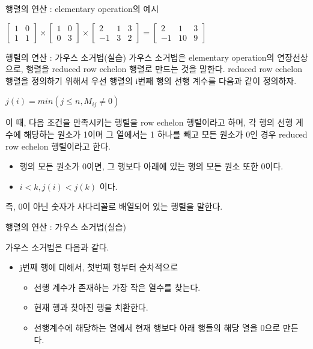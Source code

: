 \documentclass{beamer}
\begin{document}
\begin{frame}{행렬의 연산 : elementary operation의 예시}
\begin{itemize}
$ 
\left[ \begin{matrix}
1 & 0  \\
1 & 1 
\end{matrix} \right] \times 
\left[ \begin{matrix}
1 & 0  \\
0 & 3 
\end{matrix} \right] \times
\left[ \begin{matrix}
2 & 1 & 3   \\
-1 & 3 & 2 
\end{matrix} \right] = 
\left[ \begin{matrix}
2 & 1 & 3   \\
-1 & 10 & 9 
\end{matrix} \right] $

\end{itemize}
\end{frame}

\begin{frame}{행렬의 연산 : 가우스 소거법(실습)} 
가우스 소거법은 elementary operation의 연장선상으로, 행렬을 reduced row echelon 행렬로 만드는 것을 말한다. reduced row echelon 행렬을 정의하기 위해서 우선 행렬의 i번째 행의 선행 계수를 다음과 같이 정의하자. 

$j(i) = min(j \leq n, M_{ij} \neq 0)$

이 때, 다음 조건을 만족시키는 행렬을 row echelon 행렬이라고 하며, 각 행의 선행 계수에 해당하는 원소가 1이며 그 열에서는 1 하나를 빼고 모든 원소가 0인 경우 reduced row echelon 행렬이라고 한다. 

\begin{itemize} 
\item 행의 모든 원소가 0이면, 그 행보다 아래에 있는 행의 모든 원소 또한 0이다. 
\item $i<k, j(i) < j(k)$ 이다. 
\end{itemize}

즉, 0이 아닌 숫자가 사다리꼴로 배열되어 있는 행렬을 말한다. 
\end{frame}

\begin{frame}{행렬의 연산 : 가우스 소거법(실습)} 

가우스 소거법은 다음과 같다. 

\begin{itemize} 
\item j번째 행에 대해서, 첫번째 행부터 순차적으로 
\begin{itemize} 
\item 선행 계수가 존재하는 가장 작은 열수를 찾는다. 
\item 현재 행과 찾아진 행을 치환한다. 
\item 선행계수에 해당하는 열에서 현재 행보다 아래 행들의 해당 열을 0으로 만든다. 
\end{itemize}
\end{itemize}

\end{frame}
\end{document}
